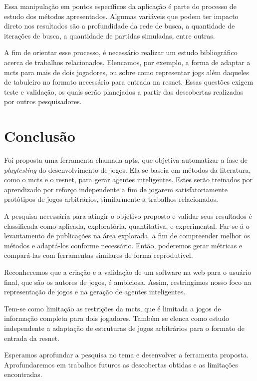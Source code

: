 \documentclass[12pt]{article}
\begin{document}
Essa manipulação em pontos específicos da aplicação é parte do processo de estudo dos métodos apresentados.
Algumas variáveis que podem ter impacto direto nos resultados são a profundidade da rede de busca, a quantidade de iterações de busca, a quantidade de partidas simuladas, entre outras.

A fim de orientar esse processo, é necessário realizar um estudo bibliográfico acerca de trabalhos relacionados.
Elencamos, por exemplo, a forma de adaptar a \gls{mcts} para mais de dois jogadores, ou sobre como representar jogs além daqueles de tabuleiro no formato necessário para entrada na \gls{resnet}.
Essas questões exigem teste e validação, os quais serão planejados a partir das descobertas realizadas por outros pesquisadores.

\section{Conclusão}%
\label{sec:conclusao}

Foi proposta uma ferramenta chamada \gls{apts}, que objetiva automatizar a fase de \textit{playtesting} do desenvolvimento de jogos.
Ela se baseia em métodos da literatura, como o \gls{mcts} e o \gls{resnet}, para gerar agentes inteligentes.
Estes serão treinados por aprendizado por reforço independente a fim de jogarem satisfatoriamente protótipos de jogos arbitrários, similarmente a trabalhos relacionados.

A pesquisa necessária para atingir o objetivo proposto e validar seus resultados é classificada como aplicada, exploratória, quantitativa, e experimental.
Far-se-á o levantamento de publicações na área explorada, a fim de compreender melhor os métodos e adaptá-los conforme necessário.
Então, poderemos gerar métricas e compará-las com ferramentas similares de forma reprodutível.

Reconhecemos que a criação e a validação de um software na web para o usuário final, que são os autores de jogos, é ambiciosa.
Assim, restringimos nosso foco na representação de jogos e na geração de agentes inteligentes.

Tem-se como limitação as restrições da \gls{mcts}, que é limitada a jogos de informação completa para dois jogadores.
Também se elenca como estudo independente a adaptação de estruturas de jogos arbitrários para o formato de entrada da \gls{resnet}.

Esperamos aprofundar a pesquisa no tema e desenvolver a ferramenta proposta.
Aprofundaremos em trabalhos futuros as descobertas obtidas e as limitações encontradas.

\printbibliography{}
\end{document}
